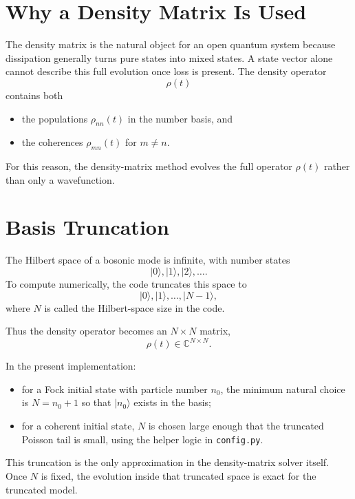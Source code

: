 \documentclass[12pt]{article}
\begin{document}
\section*{Why a Density Matrix Is Used}
The density matrix is the natural object for an open quantum system because dissipation generally turns pure states into mixed states. A state vector alone cannot describe this full evolution once loss is present. The density operator
\[
\rho(t)
\]
contains both
\begin{itemize}
\item the populations $\rho_{nn}(t)$ in the number basis, and
\item the coherences $\rho_{mn}(t)$ for $m\neq n$.
\end{itemize}

For this reason, the density-matrix method evolves the full operator $\rho(t)$ rather than only a wavefunction.

\section*{Basis Truncation}
The Hilbert space of a bosonic mode is infinite, with number states
\[
|0\rangle, |1\rangle, |2\rangle, \dots.
\]
To compute numerically, the code truncates this space to
\[
|0\rangle, |1\rangle, \dots, |N-1\rangle,
\]
where $N$ is called the Hilbert-space size in the code.

Thus the density operator becomes an $N\times N$ matrix,
\[
\rho(t) \in \mathbb{C}^{N\times N}.
\]

In the present implementation:
\begin{itemize}
\item for a Fock initial state with particle number $n_0$, the minimum natural choice is $N=n_0+1$ so that $|n_0\rangle$ exists in the basis;
\item for a coherent initial state, $N$ is chosen large enough that the truncated Poisson tail is small, using the helper logic in \texttt{config.py}.
\end{itemize}

This truncation is the only approximation in the density-matrix solver itself. Once $N$ is fixed, the evolution inside that truncated space is exact for the truncated model.
\end{document}
